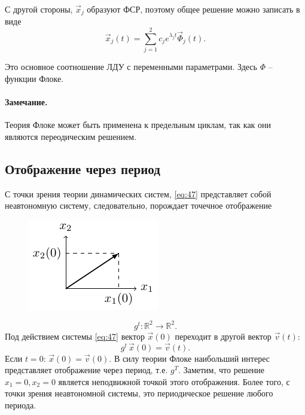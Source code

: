С другой стороны, $\vec{x}_j$ образуют ФСР, поэтому общее решение можно записать в виде
\begin{equation}
	\vec{x}_j(t)=\sum_{j=1}^2 c_j e^{\lambda_j t}\vec{\Phi}_j(t).
	\label{eq:65}
\end{equation}

Это основное соотношение ЛДУ с переменными параметрами. Здесь $\Phi$ -- функции Флоке. 

\paragraph{Замечание. } Теория Флоке может быть применена к предельным циклам, так как  они являются переодическим решением. 




\subsection{Отображение через период}

С точки зрения теории динамических систем, \eqref{eq:47} представляет собой неавтономную систему, следовательно, порождает точечное отображение 

\begin{figure}
	\centering
    \vspace{-1ex}%
    \includegraphics[scale=1.5]{img/parametric_oscillations/x_to_v}
    \label{img02}
\end{figure}
$$g^t:\mathds{R}^2\rightarrow \mathds{R}^2.$$
Под действием системы \eqref{eq:47} вектор $\vec{x}(0)$ переходит в другой вектор $\vec{v}(t)$:
\begin{equation*}
	g^t\,\vec{x}(0)=\vec{v}(t).
\end{equation*}
Если $t=0: \,\vec{x}(0)=\vec{v}(0)$.
В силу теории Флоке наибольший интерес представляет отображение через период, т.е. $g^T$. Заметим, что решение $x_1=0, x_2=0$ является неподвижной точкой этого отображения. Более того, с точки зрения неавтономной системы, это периодическое решение любого периода. 


